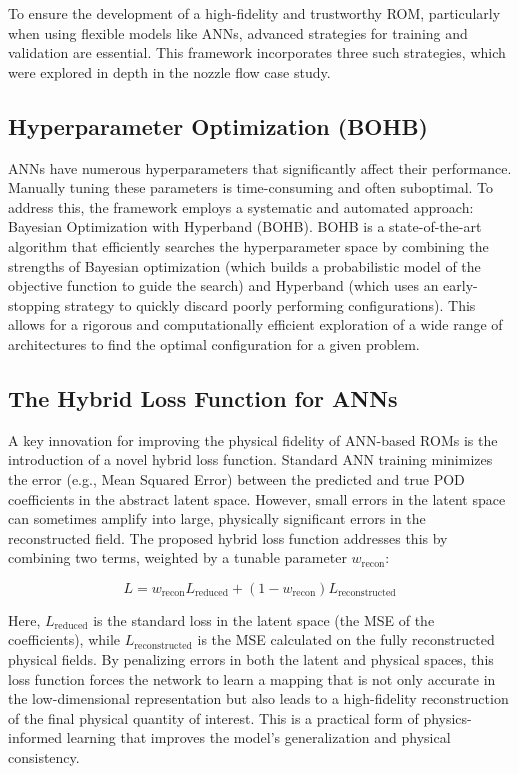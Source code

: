 \documentclass[dscexam, EN]{ufabcFHZh}
\begin{document}
To ensure the development of a high-fidelity and trustworthy ROM, particularly when using flexible models like ANNs, advanced strategies for training and validation are essential. This framework incorporates three such strategies, which were explored in depth in the nozzle flow case study. 

\subsection{Hyperparameter Optimization (BOHB)}

ANNs have numerous hyperparameters that significantly affect their performance. Manually tuning these parameters is time-consuming and often suboptimal. To address this, the framework employs a systematic and automated approach: Bayesian Optimization with Hyperband (BOHB). BOHB is a state-of-the-art algorithm that efficiently searches the hyperparameter space by combining the strengths of Bayesian optimization (which builds a probabilistic model of the objective function to guide the search) and Hyperband (which uses an early-stopping strategy to quickly discard poorly performing configurations). This allows for a rigorous and computationally efficient exploration of a wide range of architectures to find the optimal configuration for a given problem. 

\subsection{ The Hybrid Loss Function for ANNs}

A key innovation for improving the physical fidelity of ANN-based ROMs is the introduction of a novel hybrid loss function. Standard ANN training minimizes the error (e.g., Mean Squared Error) between the predicted and true POD coefficients in the abstract latent space. However, small errors in the latent space can sometimes amplify into large, physically significant errors in the reconstructed field. The proposed hybrid loss function addresses this by combining two terms, weighted by a tunable parameter $w_{\text{recon}}$:

$$L = w_{\text{recon}} L_{\text{reduced}} + (1 - w_{\text{recon}}) L_{\text{reconstructed}}$$

Here, $L_{\text{reduced}}$ is the standard loss in the latent space (the MSE of the coefficients), while $L_{\text{reconstructed}}$ is the MSE calculated on the fully reconstructed physical fields. By penalizing errors in both the latent and physical spaces, this loss function forces the network to learn a mapping that is not only accurate in the low-dimensional representation but also leads to a high-fidelity reconstruction of the final physical quantity of interest. This is a practical form of physics-informed learning that improves the model's generalization and physical consistency.
\end{document}
